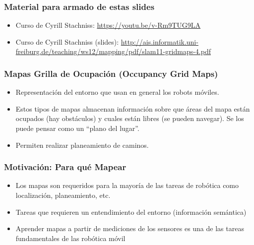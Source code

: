 \begin{frame}
	\frametitle{Material para armado de estas slides}
    
    \begin{itemize}
	\item Curso de Cyrill Stachniss: \url{https://youtu.be/v-Rm9TUG9LA}

    \item Curso de Cyrill Stachniss (slides): \url{http://ais.informatik.uni-freiburg.de/teaching/ws12/mapping/pdf/slam11-gridmaps-4.pdf}
    \end{itemize}
    

    

\end{frame}

\begin{frame}
    \frametitle{Mapas Grilla de Ocupación (Occupancy Grid Maps)}
    
    \begin{itemize}
    \item Representación del entorno que usan en general los robots móviles.
    \item Estos tipos de mapas almacenan información sobre que áreas del mapa están ocupados (hay obstáculos) y cuales están libres (se pueden navegar). Se los puede pensar como un ``plano del lugar''.
    \item Permiten realizar planeamiento de caminos.
    \end{itemize}
   
\end{frame}

\begin{frame}
    \frametitle{Motivación: Para qué Mapear}
    
    \begin{itemize}
        \item Los mapas son requeridos para la mayoría de las tareas de robótica como localización, planeamiento, etc.
        \item Tareas que requieren un entendimiento del entorno (información semántica)
        \item Aprender mapas a partir de mediciones de los sensores es una de las tareas fundamentales de las robótica móvil
    \end{itemize}
    
\end{frame}

